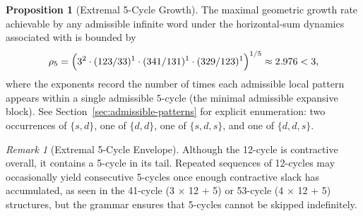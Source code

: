 \documentclass[12pt, oneside]{article}
\numberwithin{equation}{section}
\theoremstyle{definition}
\newtheorem{proposition}{Proposition}[section]
\theoremstyle{plain}
\newtheorem{lemma}[theorem]{Lemma}
\theoremstyle{remark}
\newtheorem*{remark}{Remark}
\begin{document}
\begin{proposition}[Extremal 5-Cycle Growth]
\label{prop:extremal-5-cycle}
The maximal geometric growth rate achievable by any admissible infinite
word under the horizontal-sum dynamics associated with  is bounded by
\[
\rho_{5}
=
\Bigl(
3^{2}
\cdot (123/33)^1
\cdot (341/131)^1
\cdot (329/123)^1
\Bigr)^{1/5}
\approx 2.976
< 3,
\]
where the exponents record the number of times each admissible local pattern
appears within a single admissible $5$-cycle (the minimal admissible expansive
block).  See Section~\ref{sec:admissible-patterns} for explicit enumeration:
two occurrences of $\{s,d\}$, one of $\{d,d\}$, one of $\{s,d,s\}$, and one
of $\{d,d,s\}$.




\begin{remark}[Extremal 5-Cycle Envelope]
Although the 12-cycle is contractive overall, it contains a 5-cycle in its tail. 
Repeated sequences of 12-cycles may occasionally yield consecutive 5-cycles once 
enough contractive slack has accumulated, as seen in the 41-cycle (3 × 12 + 5) 
or 53-cycle (4 × 12 + 5) structures, but the grammar ensures that 5-cycles 
cannot be skipped indefinitely. 


\end{remark}
\end{proposition}
\end{document}
